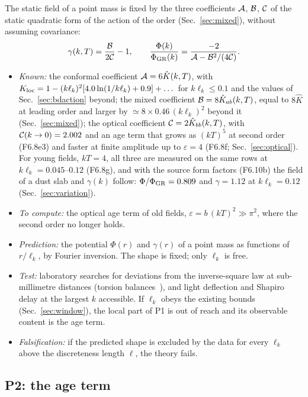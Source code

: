 The static field of a point mass is fixed by the three coefficients $\mathcal{A}$, $\mathcal{B}$, $\mathcal{C}$ of the static
quadratic form of the action of the order (Sec.~\ref{sec:mixed}), without assuming covariance:
\begin{equation}
  \gamma(k,T)=\frac{\mathcal{B}}{2\mathcal{C}}-1,\qquad
  \frac{\Phi(k)}{\Phi_{\rm GR}(k)}=\frac{-2}{\mathcal{A}-\mathcal{B}^2/(4\mathcal{C})} .
\end{equation}
\begin{itemize}
\item \emph{Known:} the conformal coefficient $\mathcal{A}=6\hat K(k,T)$, with
  $K_{\rm loc}=1-(k\ell_k)^2[4.0\ln(1/k\ell_k)+0.9]+\dots$ for $k\ell_k\le0.1$ and the values of
  Sec.~\ref{sec:bdaction} beyond; the mixed coefficient $\mathcal{B}=8\hat K_{ab}(k,T)$, equal to $8\hat K$ at leading
  order and larger by $\simeq8\times0.46\,(k\ell_k)^2$ beyond it (Sec.~\ref{sec:mixed}); the optical coefficient
  $\mathcal{C}=2\hat K_{bb}(k,T)$, with $\mathcal{C}(k\to0)=2.002$ and an age term that grows as $(kT)^5$ at second order
  (F6.8e3) and faster at finite amplitude up to $\varepsilon=4$ (F6.8f; Sec.~\ref{sec:optical}). For young fields,
  $kT=4$, all three are measured on the same rows at $k\ell_k=0.045$--$0.12$ (F6.8g), and with the source form
  factors (F6.10b) the field of a dust slab and $\gamma(k)$ follow: $\Phi/\Phi_{\rm GR}=0.809$ and $\gamma=1.12$ at
  $k\ell_k=0.12$ (Sec.~\ref{sec:variation}).
\item \emph{To compute:} the optical age term of old fields, $\varepsilon=b\,(kT)^2\gg\pi^2$, where the second
  order no longer holds.
\item \emph{Prediction:} the potential $\Phi(r)$ and $\gamma(r)$ of a point mass as functions of
  $r/\ell_k$, by Fourier inversion. The shape is fixed; only $\ell_k$ is free.
\item \emph{Test:} laboratory searches for deviations from the inverse-square law at sub-millimetre
  distances (torsion balances~\cite{Lee2020}), and light deflection and Shapiro delay at the largest $k$
  accessible. If $\ell_k$ obeys the existing bounds (Sec.~\ref{sec:window}), the local part of P1 is out of
  reach and its observable content is the age term.
\item \emph{Falsification:} if the predicted shape is excluded by the data for every $\ell_k$ above the
  discreteness length $\ell$, the theory fails.
\end{itemize}

\subsection{P2: the age term}

